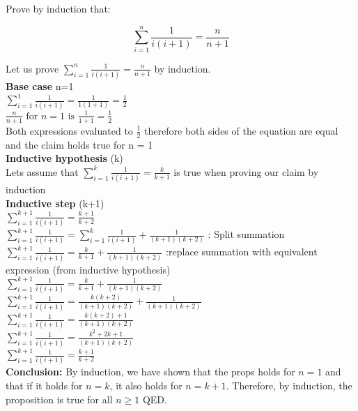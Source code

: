 \documentclass[solution,letterpaper]{cs20}
\begin{document}
    \begin{problem}
        Prove by induction that:

        \[ \sum\limits_{i = 1}^n \frac{1}{i(i+1)} = \frac{n}{n+1} \]


        \begin{solution}
            Let us prove $\sum\limits_{i = 1}^n \frac{1}{i(i+1)} = \frac{n}{n+1}$ by induction. \\

            \textbf{Base case} n=1 \\
            $\sum_{i=1}^{1} \frac{1}{i(i + 1)} = \frac{1}{1(1 + 1)} = \frac{1}{2} $ \\
            $\frac{n}{n + 1} \text{ for } n = 1 \text{ is } \frac{1}{1 + 1} = \frac{1}{2}$ \\
            Both expressions evaluated to $\frac{1}{2}$ therefore both sides of the equation are equal and the claim holds true for n = 1 \\

            \textbf{Inductive hypothesis} (k)\\
            Lets assume that $\sum\limits_{i = 1}^k \frac{1}{i(i+1)} = \frac{k}{k+1}$ is true when proving our claim by induction \\

            \textbf{Inductive step} (k+1) \\
            $\sum_{i=1}^{k+1} \frac{1}{i(i + 1)} = \frac{k+1}{k+2}$\\

            $\sum_{i=1}^{k+1} \frac{1}{i(i + 1)} = \sum_{i=1}^{k} \frac{1}{i(i + 1)} + \frac{1}{(k + 1)(k + 2)} $ : Split summation \\
            $ \sum_{i=1}^{k+1} \frac{1}{i(i + 1)} = \frac{k}{k + 1} + \frac{1}{(k + 1)(k + 2)} $ :replace summation with equivalent expression (from inductive hypothesis) \\
            $ \sum_{i=1}^{k+1} \frac{1}{i(i + 1)} = \frac{k}{k + 1} + \frac{1}{(k + 1)(k + 2)} $\\
            $ \sum_{i=1}^{k+1} \frac{1}{i(i + 1)} =\frac{k(k + 2)}{(k + 1)(k + 2)} + \frac{1}{(k + 1)(k + 2)} $ \\
            $ \sum_{i=1}^{k+1} \frac{1}{i(i + 1)} = \frac{k(k + 2) + 1}{(k + 1)(k + 2)} $ \\
            $ \sum_{i=1}^{k+1} \frac{1}{i(i + 1)} = \frac{k^2 + 2k + 1}{(k + 1)(k + 2)}$ \\
            $\sum_{i=1}^{k+1} \frac{1}{i(i + 1)} = \frac{k + 1}{k + 2}$ \\

            \textbf{Conclusion:} By induction, we have shown that the props holds for \( n = 1 \) and that if it holds for \( n = k \), it also holds for \( n = k + 1 \). Therefore, by induction, the proposition is true for all \( n \geq 1 \) QED. \\
        \end{solution}
    \end{problem}
\end{document}
